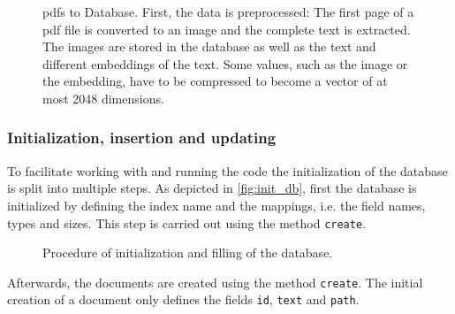 \begin{figure}[htp] %
    \centering
    
    \caption[Database procedure]{\acp{pdf} to Database. 
    First, the data is preprocessed:
    The first page of a \ac{pdf} file is converted to an image and the complete text is extracted. 
    The images are stored in the database as well as the text and different embeddings of the text.
    Some values, such as the image or the \infersent{} embedding, have to be compressed to become a vector of at most 2048 dimensions.
    }
    \label{fig:pdf2db}
\end{figure}

\subsubsection*{Initialization, insertion and updating}
To facilitate working with and running the code the initialization of the database is split into multiple steps.
As depicted in \autoref{fig:init_db}, first the database is initialized by defining the index name and the mappings, i.e. the field names, types and sizes.
This step is carried out using the method \texttt{create}.

\begin{figure}[htp] %
    \centering
    
    \caption[Initialization and filling of the database]{Procedure of initialization and filling of the database.}
    \label{fig:init_db}
\end{figure}

Afterwards, the documents are created using the method \texttt{create}.
The initial creation of a document only defines the fields \texttt{id}, \texttt{text} and \texttt{path}.


